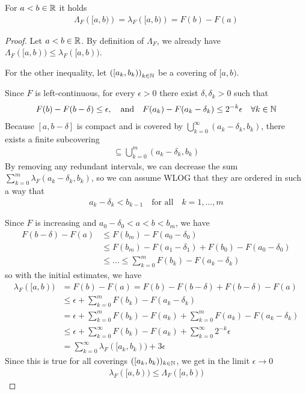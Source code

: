 \begin{thm}[]
For $a<b \in \mathbb{R}$ it holds
\begin{align*}
  \Lambda_F \left(
    [a,b)
  \right)
  = \lambda_F\left(
    [a,b)
  \right)
  = F(b) - F(a)
\end{align*}
\end{thm}
\begin{proof}
  Let $a<b \in \mathbb{R}$. By definition of $\Lambda_F$, we already have $\Lambda_F([a,b)) \leq \lambda_F([a,b))$.

  For the other inequality, let $\left(
    [a_k,b_k)
  \right)_{k \in \mathbb{N}}$ be a covering of $[a,b)$.

  Since $F$ is left-continuous, for every $\epsilon> 0$ there exist $\delta, \delta_k > 0$ such that
  \begin{align*}
    F(b) - F(b - \delta) \leq \epsilon, \quad \text{and} \quad F(a_k) - F(a_k - \delta_k) \leq 2^{-k} \epsilon \quad \forall k \in \N
  \end{align*}
  Because $[a, b - \delta]$ is compact and is covered by $\bigcup_{k=0}^{\infty}(a_k - \delta_k,b_k)$, there exists a finite subcovering
  \begin{align*}
    [a, b- \delta] \subseteq \bigcup_{k=0}^{m}(a_k - \delta_k, b_k)
  \end{align*}
  By removing any redundant intervals, we can decrease the sum $\sum_{k=0}^{m} \lambda_F(a_k - \delta_k,b_k)$, so we can assume WLOG that they are ordered in such a way that 
  \begin{align*}
    a_k - \delta_k < b_{k-1} \quad \text{for all} \quad k = 1, \ldots, m
  \end{align*}
  
  Since $F$ is increasing and $a_0 - \delta_0 < a < b < b_m$, we have
  \begin{align*}
    F(b- \delta) - F(a) 
    &\leq F(b_m) - F(a_0 - \delta_0)\\
    &\leq F(b_m) 
    - F(a_1 - \delta_1) 
    + F(b_0)
    - F(a_0 - \delta_0)\\
    &\leq \ldots \leq
    \sum_{k=0}^{m}F(b_k) - F(a_k - \delta_k)
  \end{align*}
  so with the initial estimates, we have
  \begin{align*}
    \lambda_F([a,b)) 
    &= F(b) - F(a)
    =
    F(b) - F(b - \delta) + F(b - \delta) - F(a)\\
    &\leq \epsilon + \sum_{k=0}^{m} F(b_k) - F(a_k - \delta_k)\\
    &= \epsilon + \sum_{k=0}^{m} F(b_k) - F(a_k) + \sum_{k=0}^{m} F(a_k) - F(a_k - \delta_k)\\
    &\leq \epsilon + \sum_{k=0}^{\infty}F(b_k) - F(a_k) + \sum_{k=0}^{\infty} 2^{-k} \epsilon\\
    &= \sum_{k=0}^{\infty} \lambda_F([a_k,b_k)) + 3 \epsilon
  \end{align*}
  Since this is true for all coverings $([a_k,b_k))_{k \in \mathbb{N}}$, we get in the limit $\epsilon \to 0$
  \begin{align*}
    \lambda_F([a,b)) \leq \Lambda_F([a,b))
  \end{align*}
\end{proof}


